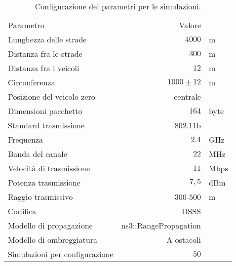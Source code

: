 \begin{table}[!h]
	\centering
	\begin{tabular}{| L{.4\linewidth} | r  l |}
		\toprule
		Parametro															&			Valore 							&					\\
		\thickerline
		Lunghezza delle strade								&			$4000$							& m				\\
		Distanza fra le strade								&			$300$								& m				\\
		Distanza fra i veicoli								&			$12$ 								& m				\\
		Circonferenza													&			$1000\pm12$					& m				\\
		Posizione del veicolo zero						&			centrale						&					\\
		\thickerline
		Dimensioni pacchetto									&				$164$							&			byte		\\	\hline
		Standard trasmissione									&				$802.11$b					&							\\	\hline
		Frequenza															&				$2.4$							&			GHz			\\	\hline
		Banda del canale											&				$22$							&			MHz			\\	\hline
		Velocità di trasmissione							&				$11$							&			Mbps		\\	\hline
		Potenza trasmissione									&				$7,5$							&			dBm			\\	\hline
		Raggio trasmissivo										&				$300$-$500$				&			m				\\	\hline
		Codifica															&				DSSS\footnotemark	&							\\	\hline
		Modello di propagazione								&				\textsf{ns3::RangePropagation}	&							\\	\hline
		Modello di ombreggiatura							&				A ostacoli				&							\\	\hline
		\thickerline
		Simulazioni	per configurazione				&			$50$								&					\\
		\bottomrule
	\end{tabular}
	\caption{Configurazione dei parametri per le simulazioni.\label{tab:parametri-simulazioni-barichello}}
\end{table}
%

